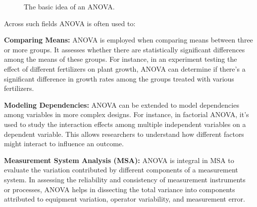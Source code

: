 \documentclass[
  a4paper,
]{scrbook}
\begin{document}
\begin{figure}[H]


\caption{\label{fig-ANOVA-basic-idea}The basic idea of an ANOVA.}

\end{figure}%

Across such fields ANOVA is often used to:

\textbf{Comparing Means:} ANOVA is employed when comparing means between
three or more groups. It assesses whether there are statistically
significant differences among the means of these groups. For instance,
in an experiment testing the effect of different fertilizers on plant
growth, ANOVA can determine if there's a significant difference in
growth rates among the groups treated with various fertilizers.

\textbf{Modeling Dependencies:} ANOVA can be extended to model
dependencies among variables in more complex designs. For instance, in
factorial ANOVA, it's used to study the interaction effects among
multiple independent variables on a dependent variable. This allows
researchers to understand how different factors might interact to
influence an outcome.

\textbf{Measurement System Analysis (MSA):} ANOVA is integral in MSA to
evaluate the variation contributed by different components of a
measurement system. In assessing the reliability and consistency of
measurement instruments or processes, ANOVA helps in dissecting the
total variance into components attributed to equipment variation,
operator variability, and measurement error.
\end{document}
